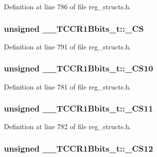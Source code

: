 Definition at line 786 of file reg\+\_\+structs.\+h.

\hypertarget{union_____t_c_c_r1_bbits__t_a103327161bbf67990c5c99e4d468d805}{
\subsubsection[{\+\_\+\+C\+S}]{\setlength{\rightskip}{0pt plus 5cm}unsigned \+\_\+\+\_\+\+T\+C\+C\+R1\+Bbits\+\_\+t\+::\+\_\+\+C\+S}}\label{union_____t_c_c_r1_bbits__t_a103327161bbf67990c5c99e4d468d805}


Definition at line 791 of file reg\+\_\+structs.\+h.

\hypertarget{union_____t_c_c_r1_bbits__t_ac67accf63ea95877003df71f4ac327a9}{
\subsubsection[{\+\_\+\+C\+S10}]{\setlength{\rightskip}{0pt plus 5cm}unsigned \+\_\+\+\_\+\+T\+C\+C\+R1\+Bbits\+\_\+t\+::\+\_\+\+C\+S10}}\label{union_____t_c_c_r1_bbits__t_ac67accf63ea95877003df71f4ac327a9}


Definition at line 781 of file reg\+\_\+structs.\+h.

\hypertarget{union_____t_c_c_r1_bbits__t_ad1bc10536beb090e3b93707b418059ce}{
\subsubsection[{\+\_\+\+C\+S11}]{\setlength{\rightskip}{0pt plus 5cm}unsigned \+\_\+\+\_\+\+T\+C\+C\+R1\+Bbits\+\_\+t\+::\+\_\+\+C\+S11}}\label{union_____t_c_c_r1_bbits__t_ad1bc10536beb090e3b93707b418059ce}


Definition at line 782 of file reg\+\_\+structs.\+h.

\hypertarget{union_____t_c_c_r1_bbits__t_ab8224372864f4dda1973f59bc2662c6b}{
\subsubsection[{\+\_\+\+C\+S12}]{\setlength{\rightskip}{0pt plus 5cm}unsigned \+\_\+\+\_\+\+T\+C\+C\+R1\+Bbits\+\_\+t\+::\+\_\+\+C\+S12}}\label{union_____t_c_c_r1_bbits__t_ab8224372864f4dda1973f59bc2662c6b}


